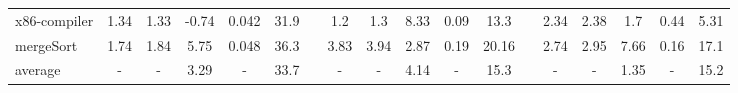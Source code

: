 \begin{tabular}{@{}l ccccc r ccccc r ccccc@{}}

    x86-compiler & 1.34 & 1.33 & -0.74 & 0.042 & 31.9 && 1.2  & 1.3 & 8.33 & 0.09 & 13.3  && 2.34 & 2.38  & 1.7  & 0.44 & 5.31  \\


    mergeSort & 1.74 & 1.84 & 5.75 & 0.048 & 36.3 && 3.83  & 3.94  & 2.87 & 0.19 & 20.16 && 2.74  & 2.95 & 7.66 & 0.16 & 17.1  \\

   \midrule
    average & - & - & 3.29 & - & 33.7  && - & - & 4.14 & - & 15.3 && - & - & 1.35 & - & 15.2 \\

    \bottomrule
  \end{tabular}
